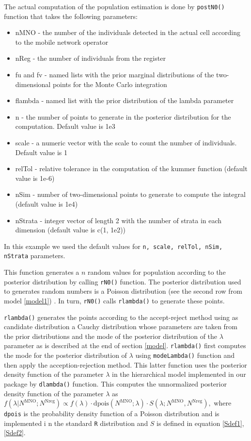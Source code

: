 \documentclass[12pt, a4paper]{article}
\begin{document}
The actual computation of the population estimation is done by \texttt{postN0()} function that takes the following parameters:
\begin{itemize}
\item nMNO - the number of the individuals detected in the actual cell according to the mobile network operator
\item nReg - the number of individuals from the register
\item fu and fv - named lists with the prior marginal distributions of the two-dimensional points for the Monte Carlo integration
\item flambda - named list with the prior distribution of the lambda parameter
\item n - the number of points to generate in the posterior distribution for the computation. Default value is 1e3
\item scale - a numeric vector with the scale to count the number of individuals. Default value is 1
\item relTol - relative tolerance in the computation of the kummer function (default value is 1e-6)
\item nSim - number of two-dimensional points to generate to compute the integral (default value is 1e4)
\item nStrata - integer vector of length 2 with the number of strata in each dimension (default value is c(1, 1e2))
\end{itemize}

In this example we used the default values for \texttt{n, scale, relTol, nSim, nStrata} parameters.

This function generates a $n$ random values for population according to the posterior distribution by calling \texttt{rN0()} function. 
The posterior distribution used to generates random numbers is a Poisson distribution (see the second row from model  
\ref{model1}) . In turn, \texttt{rN0()} calls \texttt{rlambda()} to generate these points. 

\texttt{rlambda()} generates the points according to the accept-reject method using as candidate
distribution a Cauchy distribution whose parameters are taken from the prior distributions and the mode of 
the posterior distribution of the $\lambda$ parameter as is described at the end of section \ref{model}.
\texttt{rlambda()}  first computes the mode for the posterior distribution of $\lambda$ using 
\texttt{modeLambda()} function and then apply the acception-rejection method. 
This latter function uses the posterior density function 
of the parameter ${\lambda}$ in the hierarchical model implemented in our package by \texttt{dlambda()}
function. This computes the unnormalized posterior density function of the parameter ${\lambda}$ as 
 ${f(\lambda\big | N^{\textrm{MNO}}; N^{\textrm{Nreg}})\propto f(\lambda)\cdot \textrm{dpois}(N^{\textrm{MNO}}; \lambda)\cdot S(\lambda; N^{\textrm{MNO}}, N^{\textrm{Nreg}}), }$
where \texttt{dpois} is the probability density function of a Poisson distribution and is implemented i
n the standard \texttt{R} distribution and $S$ is defined in equation \ref{Sdef1}, \ref{Sdef2}. 
\end{document}
